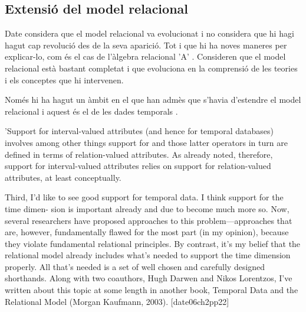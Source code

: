 



\subsection{Extensió del model relacional}


Date considera que el model relacional va evolucionat i no considera que hi hagi hagut cap revolució des de la seva aparició. Tot i que hi ha noves maneres per explicar-lo, com és el cas de l'àlgebra relacional 'A' . Consideren que el model relacional està bastant completat i que evoluciona en la comprensió de les teories i els conceptes que hi intervenen. 

Només hi ha hagut un àmbit en el que han admès que s'havia d'estendre el model relacional i aquest és el de les dades temporals .


  'Support for interval-valued attributes (and hence for temporal databases) involves among other things support for
and those latter operators in turn are defined in terms of relation-valued attributes. As already noted, therefore, support
for interval-valued attributes relies on support for relation-valued attributes, at least conceptually. 

Third, I’d like to see good support for temporal data. I think support for the time dimen-
sion is important already and due to become much more so. Now, several researchers
have proposed approaches to this problem—approaches that are, however, fundamentally
flawed for the most part (in my opinion), because they violate fundamental relational
principles. By contrast, it’s my belief that the relational model already includes what’s
needed to support the time dimension properly. All that’s needed is a set of well chosen
and carefully designed shorthands. Along with two coauthors, Hugh Darwen and Nikos
Lorentzos, I’ve written about this topic at some length in another book, Temporal Data
and the Relational Model (Morgan Kaufmann, 2003). [date06ch2pp22]




